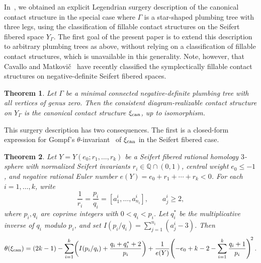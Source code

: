 \documentclass[11pt]{amsart}
\theoremstyle{plain}
\newtheorem{theorem}{Theorem}[section]
\theoremstyle{definition}
\theoremstyle{remark}
\newcommand{\Q}{\mathbb{Q}}
\begin{document}
In~\cite[Theorem~8.1]{BhupalOzbagci11}, we obtained an explicit Legendrian surgery
description of the canonical contact structure  in the
special case where $\Gamma$ is a star-shaped plumbing tree with three
legs, using the classification of fillable contact structures on the
Seifert fibered space $Y_\Gamma$. The first goal of the present paper
is to extend this description to arbitrary plumbing trees as above,
without relying on a classification of fillable contact structures, which
is unavailable in this generality.  Note, however,  that Cavallo and
Matkovi\v{c}~\cite{CavalloMatkovic2026b} have recently classified the
symplectically fillable contact structures on
negative-definite Seifert fibered spaces.

\begin{theorem}\label{thm:consistent-intro}
Let $\Gamma$ be a minimal connected negative-definite plumbing tree
with all vertices of genus zero. Then the consistent
diagram-realizable contact structure on $Y_\Gamma$ is the canonical
contact structure $\xi_{\rm can}$, up to isomorphism.
\end{theorem}

This surgery description has two consequences. The first is a
closed-form expression for Gompf's
$\theta$-invariant~\cite{Gompf98} of $\xi_{\rm can}$ in the
Seifert fibered case.

\begin{theorem}\label{thm:intro-main-seifert}
Let $Y=Y(e_0;r_1,\dots,r_k)$ be a Seifert fibered rational homology
$3$-sphere with normalized Seifert invariants $r_i\in\Q\cap(0,1)$,
central weight $e_0\le -1$, and negative rational Euler number
$e(Y)=e_0+r_1+\cdots+r_k<0$. For each $i=1,\dots,k$, write
\[
\frac{1}{r_i}=\frac{p_i}{q_i}=[a_1^i,\dots,a_{n_i}^i],
\qquad a_j^i\ge 2,
\]
where $p_i,q_i$ are coprime integers with $0<q_i<p_i$. Let $q_i^*$ be
the multiplicative inverse of $q_i$ modulo $p_i$, and set
$I(p_i/q_i)=\sum_{j=1}^{n_i}(a^i_j-3)$. Then
\[
\theta(\xi_{\rm can})
=
(2k-1)
-\sum_{i=1}^k\!\left(I(p_i/q_i)+\frac{q_i+q_i^*+2}{p_i}\right)
+
\frac{1}{e(Y)}\!\left(-e_0+k-2-\sum_{i=1}^k \frac{q_i+1}{p_i}\right)^{\!2}.
\]
\end{theorem}
\end{document}
